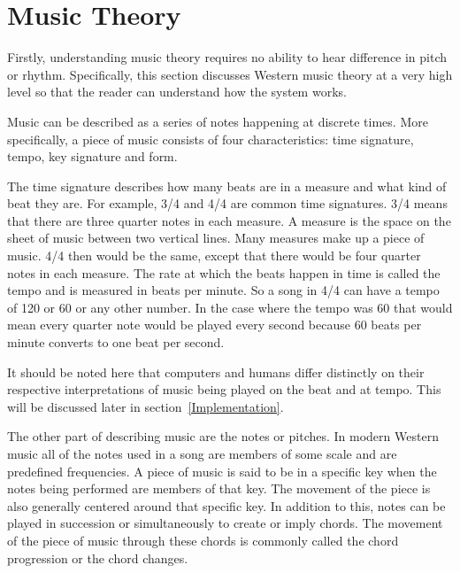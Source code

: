 \documentclass[12pt]{ucthesis}
\begin{document}
\section{Music Theory}
\label{rw:music-theory}

Firstly, understanding music theory requires no ability to hear difference in pitch or rhythm. Specifically, this section discusses Western music theory at a very high level so that the reader can understand how the system works. 

Music can be described as a series of notes happening at discrete times. More specifically, a piece of music consists of four characteristics: time signature, tempo, key signature and form.

The time signature describes how many beats are in a measure and what kind of beat they are. For example, 3/4 and 4/4 are common time signatures. 3/4 means that there are three quarter notes in each measure. A measure is the space on the sheet of music between two vertical lines. Many measures make up a piece of music. 4/4 then would be the same, except that there would be four quarter notes in each measure. The rate at which the beats happen in time is called the tempo and is measured in beats per minute. So a song in 4/4 can have a tempo of 120 or 60 or any other number. In the case where the tempo was 60 that would mean every quarter note would be played every second because 60 beats per minute converts to one beat per second. 

It should be noted here that computers and humans differ distinctly on their respective interpretations of music being played on the beat and at tempo. This will be discussed later in section~\ref{Implementation}.

The other part of describing music are the notes or pitches. In modern Western music all of the notes used in a song are members of some scale and are predefined frequencies. A piece of music is said to be in a specific key when the notes being performed are members of that key. The movement of the piece is also generally centered around that specific key. In addition to this, notes can be played in succession or simultaneously to create or imply chords. The movement of the piece of music through these chords is commonly called the chord progression or the chord changes. 
\end{document}
